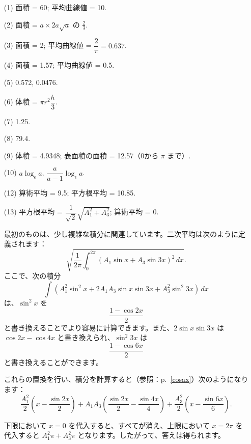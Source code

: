\documentclass[a4paper,11pt,openany]{ltjsbook}
\newcommand{\Pageref}[2][p.]{#1~\ref{#2}}
\begin{document}
\begin{enumerate}
\item[(1)] 面積 = 60; 平均曲線値 = 10.

\item[(2)] 面積 = \(a \times  2a \sqrt{a}\) の \(\frac{2}{3}\).

\item[(3)] 面積 = 2; 平均曲線値 = \(\dfrac{2}{\pi} = 0.637\).

\item[(4)] 面積 = 1.57; 平均曲線値 = 0.5.

\item[(5)] 0.572, 0.0476.

\item[(6)] 体積 = \(\pi r^2 \dfrac{h}{3}\).

\item[(7)] 1.25.

\item[(8)] 79.4.

\item[(9)] 体積 = 4.9348; 表面積の面積 = 12.57（0から \(\pi\) まで）.

\item[(10)] \(a\log_\epsilon a\), \(\dfrac{a}{a - 1} \log_\epsilon a\).

\item[(12)] 算術平均 = 9.5; 平方根平均 = 10.85.

\item[(13)] 平方根平均 = \(\dfrac{1}{\sqrt{2}} \sqrt{A_1^2 + A_3^2}\); 算術平均 = 0.

最初のものは、少し複雑な積分に関連しています。二次平均は次のように定義されます：
\[
\sqrt{\dfrac{1}{2\pi} \int_0^{2\pi} (A_1 \sin x + A_3 \sin 3x)^2\, dx}.
\]
ここで、次の積分
\[
\int (A_1^2 \sin^2 x + 2A_1 A_3 \sin x \sin 3x + A_3^2 \sin^2 3x)\, dx
\]
は、$\sin^2 x$ を
\[
\dfrac{1 - \cos 2x}{2}
\]
と書き換えることでより容易に計算できます。また、$2\sin x \sin 3x$ は $\cos 2x - \cos 4x$ と書き換えられ、$\sin^2 3x$ は
\[
\dfrac{1 - \cos 6x}{2}
\]
と書き換えることができます。

これらの置換を行い、積分を計算すると（参照：\Pageref{cosax}）次のようになります：
\[
\dfrac{A_1^2}{2} \left( x - \dfrac{\sin 2x}{2} \right)
 + A_1 A_3 \left( \dfrac{\sin 2x}{2} - \dfrac{\sin 4x}{4} \right)
 + \dfrac{A_3^2}{2} \left( x - \dfrac{\sin 6x}{6} \right).
\]

下限において $x = 0$ を代入すると、すべてが消え、上限において $x = 2\pi$ を代入すると $A_1^2 \pi + A_3^2 \pi$ となります。したがって、答えは得られます。


\end{enumerate}
\end{document}
